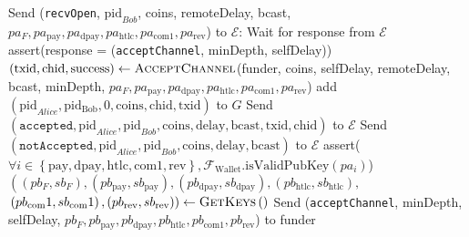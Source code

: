 \begin{algorithmic}[1]
      \EndIndent
    \EndIndent
    \Indent
      \State Send (\texttt{recvOpen}, $\mathrm{pid}_{Bob}$, coins, remoteDelay,
      bcast,
      \Indent
        \Indent
          \State $pa_F, pa_{\mathrm{pay}}, pa_{\mathrm{dpay}},
          pa_{\mathrm{htlc}}, pa_{\mathrm{com}1}, pa_{\mathrm{rev}}$) to
          $\mathcal{E}$:
        \EndIndent
      \EndIndent
      \State Wait for response from $\mathcal{E}$
      \State assert(response = (\texttt{acceptChannel}, minDepth, selfDelay))
      \State $\left(\mathrm{txid}, \mathrm{chid}, \mathrm{success}\right) \gets
      \textsc{AcceptChannel}$(funder, coins, selfDelay,
      \Indent
        \Indent
          \State remoteDelay, bcast, minDepth,
          \State $pa_F, pa_{\mathrm{pay}}, pa_{\mathrm{dpay}},
          pa_{\mathrm{htlc}}, pa_{\mathrm{com}1}, pa_{\mathrm{rev}}$)
        \EndIndent
      \EndIndent
        \State add $\left(\mathrm{pid}_{Alice}, \mathrm{pid_{Bob}}, 0,
        \mathrm{coins}, \mathrm{chid}, \mathrm{txid}\right)$ to $G$
        \State Send $\left(\mathtt{accepted}, \mathrm{pid}_{Alice},
        \mathrm{pid}_{Bob}, \mathrm{coins}, \mathrm{delay}, \mathrm{bcast},
        \mathrm{txid}, \mathrm{chid}\right)$
        \Indent
          \Indent
            \State to $\mathcal{E}$
          \EndIndent
        \EndIndent
      \Else
        \State Send $\left(\mathtt{notAccepted}, \mathrm{pid}_{Alice},
        \mathrm{pid}_{Bob}, \mathrm{coins}, \mathrm{delay},
        \mathrm{bcast}\right)$ to $\mathcal{E}$
      \EndIf
    \EndIndent
    \State
      \State assert($\forall i \in \left\{\mathrm{pay}, \mathrm{dpay},
      \mathrm{htlc}, \mathrm{com}1, \mathrm{rev}\right\},
      \mathcal{F}_{\mathrm{Wallet}}.\mathrm{isValidPubKey}\left(pa_i\right)$)
      \State $\left(\left(pb_F, sb_F\right), \left(pb_\mathrm{pay},
      sb_\mathrm{pay}\right), \left(pb_\mathrm{dpay}, sb_\mathrm{dpay}\right),
      \left(pb_\mathrm{htlc}, sb_\mathrm{htlc}\right),\right.$
      \State $\left.\left(pb_\mathrm{com}1, sb_\mathrm{com}1\right),
      \left(pb_\mathrm{rev}, sb_\mathrm{rev}\right)\right) \gets
      \textsc{GetKeys}\left(\right)$
      \State Send (\texttt{acceptChannel}, minDepth, selfDelay,
      \Indent
        \Indent
          \State $pb_F, pb_{\mathrm{pay}}, pb_{\mathrm{dpay}},
          pb_{\mathrm{htlc}}, pb_{\mathrm{com}1}, pb_{\mathrm{rev}}$) to funder

\end{algorithmic}
